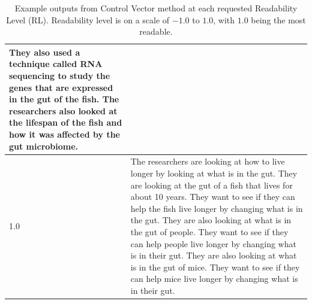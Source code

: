 \begin{table}[]
\begin{tabular}{l|p{}}
They also used a technique called RNA sequencing to study the genes that are expressed in the gut of the fish. The researchers also looked at the lifespan of the fish and how it was affected by the gut microbiome.\\ \hline
1.0 & The researchers are looking at how to live longer by looking at what is in the gut.  They are looking at the gut of a fish that lives for about 10 years.  They want to see if they can help the fish live longer by changing what is in the gut.  They are also looking at what is in the gut of people.  They want to see if they can help people live longer by changing what is in their gut.  They are also looking at what is in the gut of mice.   They want to see if they can help mice live longer by changing what is in their gut. \\ \hline
\end{tabular}
\caption[Example outputs from Control Vector method at each requested Readability Level.]{Example outputs from Control Vector method at each requested Readability Level (RL). Readability level is on a scale of $-1.0$ to $1.0$, with $1.0$ being the most readable.}\label{tab:cv-ex-outputs}
\end{table}

